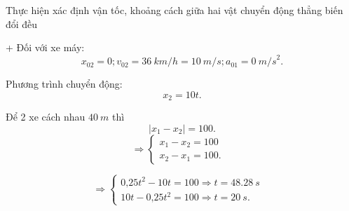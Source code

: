 \begin{dang}{Thực hiện xác định vận tốc, khoảng cách giữa hai vật chuyển động thẳng biến đổi đều}
{		+ Đối với xe máy:
		$$x_{02} = 0; v_{02} =\SI{36}{km/h}=\SI{10}{m/s}; a_{01} = \SI{0}{m/s}^2.$$	
		
		Phương trình chuyển động:
		$$x_2 =10t.$$
		
		Để 2 xe cách nhau $\SI{40}{m}$ thì 
		$$|x_1-x_2| = 100.$$
		$$\Rightarrow \left\{\begin{array}{ll}{x_1-x_2 =100}&\\{x_2-x_1 =100.}&\end{array}\right.$$
		
		$$\Rightarrow \left\{\begin{array}{ll}{\text{0,25}t^2 -10t=100 \Rightarrow t=\SI{48,28}{s}}&\\{10t-\text{0,25}t^2=100\Rightarrow t =\SI{20}{s}.}&\end{array}\right.$$
		
		
	}
\end{dang}
